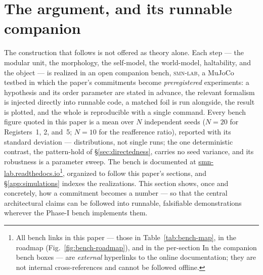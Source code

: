 \documentclass{article}
\newcommand{\rtdlink}[2]{\href{https://smn-lab.readthedocs.io/en/latest/#1}{#2}}
\begin{document}
\section{The argument, and its runnable companion}\label{sec:companion}

The construction that follows is not offered as theory alone.  Each step
--- the modular unit, the morphology, the self-model, the world-model,
haltability, and the object --- is realized in an open companion bench,
\textsc{smn-lab}, a MuJoCo testbed in which the paper's commitments become
\emph{preregistered} experiments: a hypothesis and its order parameter are
stated in advance, the relevant formalism is injected directly into
runnable code, a matched foil is run alongside, the result is plotted, and
the whole is reproducible with a single command.  Every bench figure
quoted in this paper is a mean over $N$ independent seeds ($N{=}20$ for
Registers~1, 2, and~5; $N{=}10$ for the reafference ratio), reported with
its standard deviation --- distributions, not single runs; the one
deterministic contrast, the pattern-hold of \S\ref{sec:directedness},
carries no seed variance, and its robustness is a parameter sweep.  The
bench is documented
at \rtdlink{}{smn-lab.readthedocs.io}\footnote{All bench links in this paper
--- those in Table~\ref{tab:bench-map}, in the roadmap
(Fig.~\ref{fig:bench-roadmap}), and in the per-section \textsf{In the
companion bench} boxes --- are \emph{external} hyperlinks to the online
documentation; they are not internal cross-references and cannot be
followed offline.}, organized to follow this paper's
sections, and \S\ref{app:simulations} indexes the realizations.  This
section shows, once and concretely, how a commitment becomes a number ---
so that the central architectural claims can be followed into runnable,
falsifiable demonstrations wherever the Phase-I bench implements them.
\end{document}
